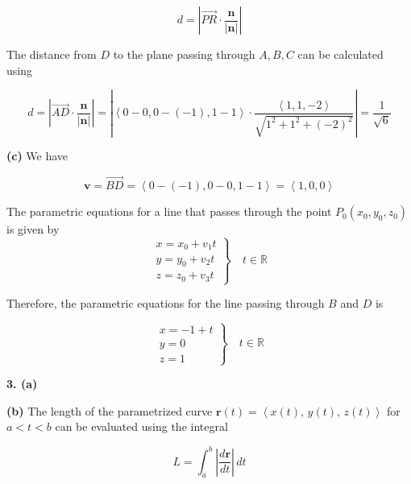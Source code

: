 \documentclass{article}
\begin{document}
\[d=\left|\overrightarrow{PR}\cdot\frac{\mathbf n}{|\mathbf n|}\right|\]

The distance from $D$ to the plane passing through $A, B, C$ can be calculated using

\[d=\left|\overrightarrow{AD}\cdot\frac{\mathbf n}{|\mathbf n|}\right|=\left|\left\langle0-0,0-(-1),1-1\right\rangle\cdot\frac{\left\langle1,1,-2\right\rangle}{\sqrt{1^2+1^2+(-2)^2}}\right|=\boxed{\frac1{\sqrt6}}\]

\textbf{(c)} We have

\[\mathbf{v}=\overrightarrow{BD}=\left\langle0-(-1),0-0,1-1\right\rangle=\left\langle1,0,0\right\rangle\]

The parametric equations for a line that passes through the point $P_0(x_0,y_0,z_0)$ is given by
\[\left.\begin{array}{c}
x=x_0+v_1t\\
y=y_0+v_2t\\
z=z_0+v_3t
\end{array}\right\}\quad t\in\mathbb{R}\]

Therefore, the parametric equations for the line passing through $B$ and $D$ is

\[\boxed{\left.\begin{array}{l}
x=-1+t\\
y=0\\
z=1
\end{array}\right\}\quad t\in\mathbb{R}}\]

\vspace{1em}

\textbf{3. (a)}
\begin{center}
\end{center}

\textbf{(b)} The length of the parametrized curve $\mathbf{r}(t)=\left\langle x(t),\,y(t),\,z(t)\right\rangle$ for $a<t<b$ can be evaluated using the integral

\[L=\int_a^b\left|\frac{d\mathbf r}{dt}\right|\,dt\]
\end{document}
